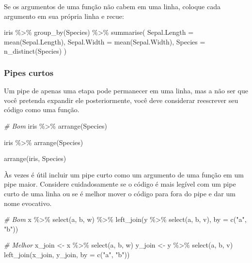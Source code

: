 \documentclass[
]{book}
\newenvironment{Shaded}{\begin{snugshade}}{\end{snugshade}}
\newcommand{\AttributeTok}[1]{\textcolor[rgb]{0.77,0.63,0.00}{#1}}
\newcommand{\CommentTok}[1]{\textcolor[rgb]{0.56,0.35,0.01}{\textit{#1}}}
\newcommand{\FunctionTok}[1]{\textcolor[rgb]{0.00,0.00,0.00}{#1}}
\newcommand{\NormalTok}[1]{#1}
\newcommand{\OtherTok}[1]{\textcolor[rgb]{0.56,0.35,0.01}{#1}}
\newcommand{\SpecialCharTok}[1]{\textcolor[rgb]{0.00,0.00,0.00}{#1}}
\newcommand{\StringTok}[1]{\textcolor[rgb]{0.31,0.60,0.02}{#1}}
\begin{document}
Se os argumentos de uma função não cabem em uma linha, coloque cada argumento
em sua própria linha e recue:

\begin{Shaded}
\begin{Highlighting}[]
\NormalTok{iris }\SpecialCharTok{\%\textgreater{}\%}
  \FunctionTok{group\_by}\NormalTok{(Species) }\SpecialCharTok{\%\textgreater{}\%}
  \FunctionTok{summarise}\NormalTok{(}
    \AttributeTok{Sepal.Length =} \FunctionTok{mean}\NormalTok{(Sepal.Length),}
    \AttributeTok{Sepal.Width =} \FunctionTok{mean}\NormalTok{(Sepal.Width),}
    \AttributeTok{Species =} \FunctionTok{n\_distinct}\NormalTok{(Species)}
\NormalTok{  )}
\end{Highlighting}
\end{Shaded}

\hypertarget{pipes-curtos}{%
\subsubsection{Pipes curtos}\label{pipes-curtos}}

Um pipe de apenas uma etapa pode permanecer em uma linha, mas a não ser que
você pretenda expandir ele posteriormente, você deve considerar reescrever seu
código como uma função.

\begin{Shaded}
\begin{Highlighting}[]
\CommentTok{\# Bom}
\NormalTok{iris }\SpecialCharTok{\%\textgreater{}\%} \FunctionTok{arrange}\NormalTok{(Species)}

\NormalTok{iris }\SpecialCharTok{\%\textgreater{}\%} 
  \FunctionTok{arrange}\NormalTok{(Species)}

\FunctionTok{arrange}\NormalTok{(iris, Species)}
\end{Highlighting}
\end{Shaded}

Às vezes é útil incluir um pipe curto como um argumento de uma função em um
pipe maior. Considere cuidadosamente se o código é mais legível com um pipe
curto de uma linha ou se é melhor mover o código para fora do pipe e dar um
nome evocativo.

\begin{Shaded}
\begin{Highlighting}[]
\CommentTok{\# Bom}
\NormalTok{x }\SpecialCharTok{\%\textgreater{}\%}
  \FunctionTok{select}\NormalTok{(a, b, w) }\SpecialCharTok{\%\textgreater{}\%}
  \FunctionTok{left\_join}\NormalTok{(y }\SpecialCharTok{\%\textgreater{}\%} \FunctionTok{select}\NormalTok{(a, b, v), }\AttributeTok{by =} \FunctionTok{c}\NormalTok{(}\StringTok{"a"}\NormalTok{, }\StringTok{"b"}\NormalTok{))}

\CommentTok{\# Melhor}
\NormalTok{x\_join }\OtherTok{\textless{}{-}}\NormalTok{ x }\SpecialCharTok{\%\textgreater{}\%} \FunctionTok{select}\NormalTok{(a, b, w)}
\NormalTok{y\_join }\OtherTok{\textless{}{-}}\NormalTok{ y }\SpecialCharTok{\%\textgreater{}\%} \FunctionTok{select}\NormalTok{(a, b, v)}
\FunctionTok{left\_join}\NormalTok{(x\_join, y\_join, }\AttributeTok{by =} \FunctionTok{c}\NormalTok{(}\StringTok{"a"}\NormalTok{, }\StringTok{"b"}\NormalTok{))}
\end{Highlighting}
\end{Shaded}
\end{document}
